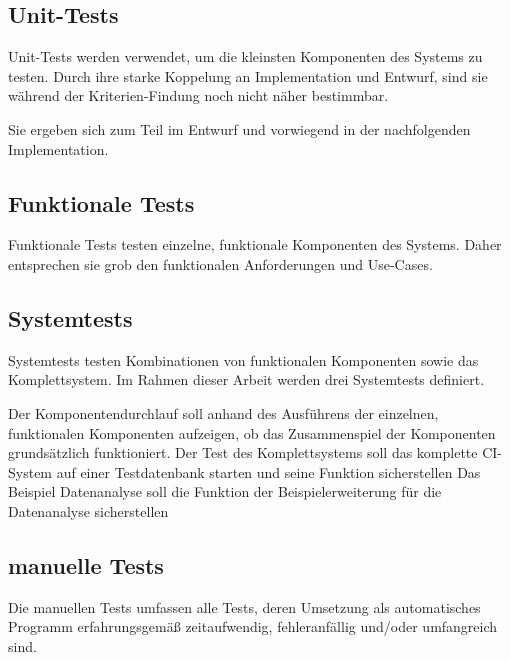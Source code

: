 \subsection{Unit-Tests}

Unit-Tests werden verwendet, um die kleinsten Komponenten des Systems zu testen.
Durch ihre starke Koppelung an Implementation und Entwurf,
sind sie w\"ahrend der Kriterien-Findung noch nicht n\"aher bestimmbar.

Sie ergeben sich zum Teil im Entwurf und vorwiegend in
der nachfolgenden Implementation.

\subsection{Funktionale Tests}

Funktionale Tests testen einzelne, funktionale Komponenten des Systems.
Daher entsprechen sie grob den funktionalen Anforderungen und Use-Cases.

\subsection{Systemtests}

Systemtests testen Kombinationen von funktionalen Komponenten sowie das Komplettsystem.
Im Rahmen dieser Arbeit werden drei Systemtests definiert.


\begin{description}
  \dhitem[Komponentendurchlauf:]
    Der Komponentendurchlauf soll anhand des Ausführens der einzelnen, funktionalen Komponenten aufzeigen,
    ob das Zusammenspiel der Komponenten grunds\"atzlich funktioniert.
  \dhitem[Komplettstystem:]
    Der Test des Komplettsystems soll das komplette CI-System auf einer Testdatenbank starten
    und seine Funktion sicherstellen
    Das Beispiel Datenanalyse soll die Funktion der Beispielerweiterung für die Datenanalyse sicherstellen
\end{description}

\subsection{manuelle Tests}

Die manuellen Tests umfassen alle Tests,
deren Umsetzung als automatisches Programm erfahrungsgemäß zeitaufwendig,
fehleranfällig und/oder umfangreich sind.

